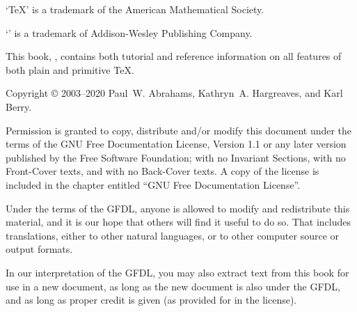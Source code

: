 



% 
\noheadlinetrue
\sinkage

\noindent `\TeX' is a trademark of the American Mathematical Society.

\noindent `\Metafont' is a trademark of Addison-Wesley Publishing Company.

\bigskip
\noindent This book, \thisbook, contains both tutorial and reference
information on all features of both plain and primitive \TeX.

\bigskip

\noindent Copyright \copyright{} 2003--2020 Paul~W. Abrahams,
Kathryn~A. Hargreaves, and Karl Berry.

\bigskip
\noindent Permission is granted to copy, distribute and/or modify this
document under the terms of the GNU Free Documentation License, Version
1.1 or any later version published by the Free Software Foundation; with
no Invariant Sections, with no Front-Cover texts, and with no Back-Cover
texts.  A copy of the license is included in the chapter entitled ``GNU
Free Documentation License''.

\medskip\noindent
Under the terms of the GFDL, anyone is allowed to modify and
redistribute this material, and it is our hope that others will find it
useful to do so.  That includes translations, either to other natural
languages, or to other computer source or output formats.

\medskip\noindent
In our interpretation of the GFDL, you may also extract text from this
book for use in a new document, as long as the new document is also
under the GFDL, and as long as proper credit is given (as provided for
in the license).


\pagebreak
\byebye
